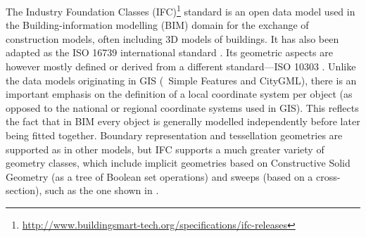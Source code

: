 The Industry Foundation Classes (IFC)\footnote{\url{http://www.buildingsmart-tech.org/specifications/ifc-releases}} standard is an open data model used in the Building-information modelling (BIM) domain for the exchange of construction models, often including 3D models of buildings.
It has also been adapted as the ISO 16739 international standard \citep{ISO16739:2013}.
Its geometric aspects are however mostly defined or derived from a different standard---ISO 10303 \citep{ISO10303:2014}.
Unlike the data models originating in GIS (\eg\ Simple Features and CityGML), there is an important emphasis on the definition of a local coordinate system per object (as opposed to the national or regional coordinate systems used in GIS).
This reflects the fact that in BIM every object is generally modelled independently before later being fitted together.
Boundary representation and tessellation geometries are supported as in other models, but IFC supports a much greater variety of geometry classes, which include implicit geometries based on Constructive Solid Geometry (as a tree of Boolean set operations) and sweeps (based on a cross-section), such as the one shown in .


